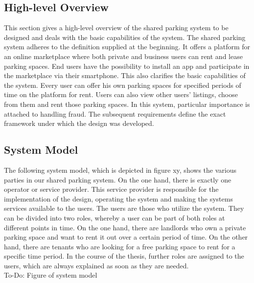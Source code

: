 \documentclass[
a4paper,     %
titlepage,   %
14pt         %
]{scrartcl}  %
\theoremstyle{mystyle}
\begin{document}
\subsection{High-level Overview}
This section gives a high-level overview of the shared parking system to be designed and deals with the basic capabilities of the system. The shared parking system adheres to the definition supplied at the beginning. It offers a platform for an online marketplace where both private and business users can rent and lease parking spaces. End users have the possibility to install an app and participate in the marketplace via their smartphone. This also clarifies the basic capabilities of the system. Every user can offer his own parking spaces for specified periods of time on the platform for rent. Users can also view other users' listings, choose from them and rent those parking spaces. In this system, particular importance is attached to handling fraud. The subsequent requirements define the exact framework under which the design was developed. 

\subsection{System Model}
The following system model, which is depicted in figure xy, shows the various parties in our shared parking system. On the one hand, there is exactly one operator or service provider. This service provider is responsible for the implementation of the design, operating the system and making the systems services available to the users. The users are those who utilize the system. They can be divided into two roles, whereby a user can be part of both roles at different points in time. On the one hand, there are landlords who own a private parking space and want to rent it out over a certain period of time. On the other hand, there are tenants who are looking for a free parking space to rent for a specific time period. In the course of the thesis, further roles are assigned to the users, which are always explained as soon as they are needed.\\

To-Do: Figure of system model
\end{document}
